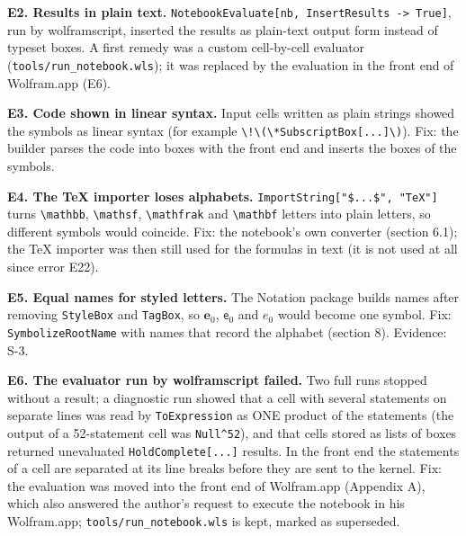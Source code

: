 \documentclass[
  10pt,
]{article}
\begin{document}
\textbf{E2. Results in plain text.}
\texttt{NotebookEvaluate{[}nb,\ InsertResults\ -\textgreater{}\ True{]}},
run by wolframscript, inserted the results as plain-text output form
instead of typeset boxes. A first remedy was a custom cell-by-cell
evaluator (\texttt{tools/run\_notebook.wls}); it was replaced by the
evaluation in the front end of Wolfram.app (E6).

\textbf{E3. Code shown in linear syntax.} Input cells written as plain
strings showed the symbols as linear syntax (for example
\texttt{\textbackslash{}!\textbackslash{}(\textbackslash{}*SubscriptBox{[}...{]}\textbackslash{})}).
Fix: the builder parses the code into boxes with the front end and
inserts the boxes of the symbols.

\textbf{E4. The TeX importer loses alphabets.}
\texttt{ImportString{[}"\$...\$",\ "TeX"{]}} turns
\texttt{\textbackslash{}mathbb}, \texttt{\textbackslash{}mathsf},
\texttt{\textbackslash{}mathfrak} and \texttt{\textbackslash{}mathbf}
letters into plain letters, so different symbols would coincide. Fix:
the notebook's own converter (section 6.1); the TeX importer was then
still used for the formulas in text (it is not used at all since error
E22).

\textbf{E5. Equal names for styled letters.} The Notation package builds
names after removing \texttt{StyleBox} and \texttt{TagBox}, so
\(\mathbf e_0\), \(\mathsf e_0\) and \(e_0\) would become one symbol.
Fix: \texttt{SymbolizeRootName} with names that record the alphabet
(section 8). Evidence: S-3.

\textbf{E6. The evaluator run by wolframscript failed.} Two full runs
stopped without a result; a diagnostic run showed that a cell with
several statements on separate lines was read by \texttt{ToExpression}
as ONE product of the statements (the output of a 52-statement cell was
\texttt{Null\^{}52}), and that cells stored as lists of boxes returned
unevaluated \texttt{HoldComplete{[}...{]}} results. In the front end the
statements of a cell are separated at its line breaks before they are
sent to the kernel. Fix: the evaluation was moved into the front end of
Wolfram.app (Appendix A), which also answered the author's request to
execute the notebook in his Wolfram.app;
\texttt{tools/run\_notebook.wls} is kept, marked as superseded.
\end{document}
